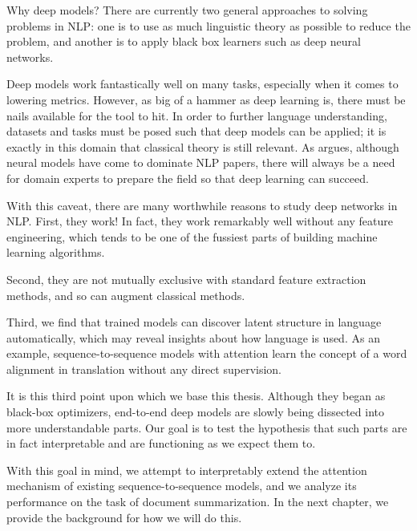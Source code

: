 \documentclass[12pt]{report}
\begin{document}
Why deep models? There are currently two general approaches to solving problems in NLP: one is to use as much linguistic theory as possible to reduce the problem, and another is to apply black box learners such as deep neural networks.

Deep models work fantastically well on many tasks, especially when it comes to lowering metrics. However, as big of a hammer as deep learning is, there must be nails available for the tool to hit.
In order to further language understanding, datasets and tasks must be posed such that deep models can be applied; it is exactly in this domain that classical theory is still relevant.
As \citet{Manning2016} argues, although neural models have come to dominate NLP papers, there will always be a need for domain experts to prepare the field so that deep learning can succeed.


With this caveat, there are many worthwhile reasons to study deep networks in NLP. First, they work! In fact, they work remarkably well without any feature engineering, which tends to be one of the fussiest parts of building machine learning algorithms.

Second, they are not mutually exclusive with standard feature extraction methods, and so can augment classical methods.

Third, we find that trained models can discover latent structure in language automatically, which may reveal insights about how language is used. As an example, sequence-to-sequence models with attention \citep{bahdanau2014neural} learn the concept of a word alignment in translation without any direct supervision.


It is this third point upon which we base this thesis. Although they began as black-box optimizers, end-to-end deep models are slowly being dissected into more understandable parts. Our goal is to test the hypothesis that such parts are in fact interpretable and are functioning as we expect them to.

With this goal in mind, we attempt to interpretably extend the attention mechanism of existing sequence-to-sequence models, and we analyze its performance on the task of document summarization. In the next chapter, we provide the background for how we will do this.
\end{document}
